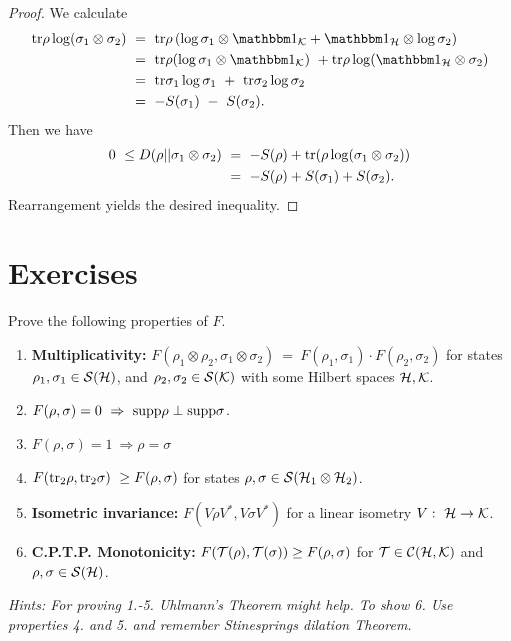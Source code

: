   \begin{proof}
   We calculate
   \begin{align}
   \tr \rho \log (\sigma_1 \otimes \sigma_2) \ 
   & = \ \tr \rho \left(\log \sigma_1 \otimes \bbmeins_\cK + \bbmeins_\cH \otimes \log \sigma_2 \right) \\
   & = \ \tr \rho (\log \sigma_1 \otimes \bbmeins_\cK) \ + \tr \rho \log (\bbmeins_{\cH} \otimes \sigma_2)
   \\
   & = \ \tr \sigma_1 \log \sigma_1 \ + \ \tr \sigma_2 \log \sigma_2 \\
   & = \ -S(\sigma_1) \ - \ S(\sigma_2). 
   \end{align}
  Then we have
  \begin{align} 
   0 \ \leq D(\rho|| \sigma_1 \otimes \sigma_2)   \ 
   &= \ -S(\rho) + \tr(\rho \log (\sigma_1 \otimes \sigma_2)) \\
   &= \ -S(\rho) + S(\sigma_1) + S(\sigma_2).
  \end{align}
  Rearrangement yields the desired inequality. 
  \end{proof}



\section{Exercises}

\begin{exercise} \label{exercise_fidelity}
Prove the following properties of $F$. 
\begin{enumerate}
	\item \textbf{Multiplicativity:} $F(\rho_1 \otimes \rho_2, \sigma_1 \otimes \sigma_2) \ 
	= \ F(\rho_1,\sigma_1) \cdot F(\rho_2, \sigma_2)$ 
	for states $\rho_1, \sigma_1 \in {\mathcal S}({\mathcal H})$, and $\rho_2, \sigma_2 \in {\mathcal S}({\mathcal K})$ with some Hilbert spaces ${\mathcal H}, {\mathcal K}$. 
	\item $F(\rho, \sigma) = 0 \ \Rightarrow \ \supp \rho \perp \supp \sigma$.
	\item $F(\rho, \sigma) = 1 \ \Rightarrow \rho = \sigma$
	\item $F(\mathrm{tr}_2 \rho, \mathrm{tr}_2 \sigma)  \ \geq F(\rho, \sigma)$ for states $\rho,\sigma \in {\mathcal S}({\mathcal H}_1 \otimes {\mathcal H}_2)$. 
	\item \textbf{Isometric invariance:} $F(V \rho V^\ast, V \sigma V^\ast )$ 
	for a linear isometry $V: \ {\mathcal H} \rightarrow {\mathcal K}$. 
	\item \textbf{C.P.T.P. Monotonicity:} $F({\mathcal T}(\rho), {\mathcal T}(\sigma)) \geq F(\rho, \sigma)$ for ${\mathcal T} \in {\mathcal C}({\mathcal H}, {\mathcal K})$ and $\rho, \sigma \in {\mathcal S}({\mathcal H})$.
\end{enumerate}
\emph{Hints: For proving 1.-5. Uhlmann's Theorem might help. To show 6. Use properties 4. and 5. and remember Stinesprings dilation Theorem.} 
\end{exercise}

